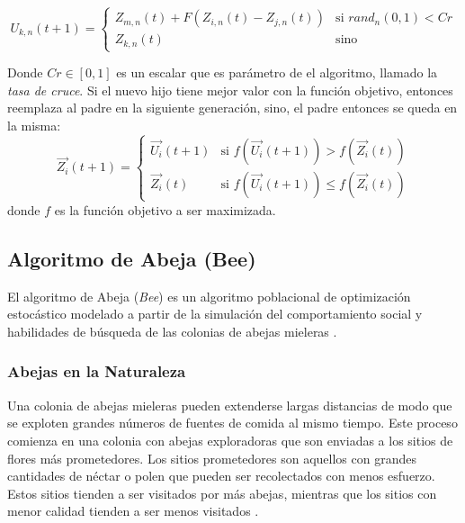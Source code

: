 \[
  U_{k,n}(t+1) =
  \begin{cases}
    Z_{m,n}(t) + F(Z_{i,n}(t) - Z_{j,n}(t))  & \text{si } rand_n(0,1) < Cr\\
    Z_{k,n}(t)                               & \text{sino}
  \end{cases}
\]

Donde $Cr \in [0, 1]$ es un escalar que es par\'ametro de el algoritmo,
llamado la \emph{tasa de cruce}. Si el nuevo hijo tiene mejor valor
con la funci\'on objetivo, entonces reemplaza al padre en la siguiente
generaci\'on, sino, el padre entonces se queda en la misma:
\[
  \overrightarrow{Z_i}(t+1) =
  \begin{cases}
    \overrightarrow{U_i}(t+1) & \text{si } f(\overrightarrow{U_i}(t+1)) > f(\overrightarrow{Z_i}(t)) \\
    \overrightarrow{Z_i}(t)   & \text{si } f(\overrightarrow{U_i}(t+1)) \leq f(\overrightarrow{Z_i}(t))
  \end{cases}
\]
donde $f$ es la funci\'on objetivo a ser maximizada.

\subsection{Algoritmo de Abeja (Bee)}

    El algoritmo de Abeja (\emph{Bee}) es un algoritmo poblacional de
optimización estocástico modelado a partir de la simulación del comportamiento
social y habilidades de búsqueda de las colonias de abejas mieleras
\cite{BEE_0}.

\subsubsection{Abejas en la Naturaleza}

    Una colonia de abejas mieleras pueden extenderse largas distancias
de modo que se exploten grandes números de fuentes de comida al mismo
tiempo. Este proceso comienza en una colonia con abejas exploradoras
que son enviadas a los sitios de flores más prometedores. Los sitios
prometedores son aquellos con grandes cantidades de néctar o polen
que pueden ser recolectados con menos esfuerzo. Estos sitios tienden a ser
visitados por más  abejas, mientras que los sitios con menor calidad tienden
a ser menos visitados \cite{BEE_0}.

